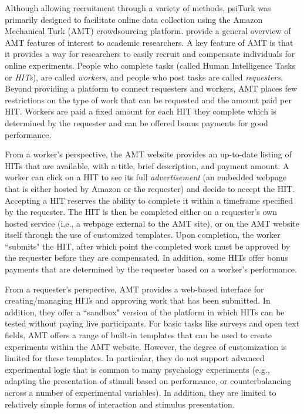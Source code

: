 \documentclass[twocolumn]{svjour3}          %
\begin{document}
Although allowing recruitment through a variety of methods,
\textsf{psiTurk} was primarily designed to facilitate online data collection using
the Amazon Mechanical Turk (AMT) crowdsourcing platform.
\cite{Mason:2012xy} provide a general overview of AMT features of
interest to academic researchers.  A key feature of AMT is that it provides a way for researchers
to easily recruit and compensate individuals for online experiments.  
People who complete tasks (called Human Intelligence Tasks or \emph{HITs}), are 
called \emph{workers}, and people who post tasks are called \emph{requesters}.
Beyond providing a platform to connect requesters and workers, AMT places few restrictions 
on the type of work that can be requested and the amount paid per HIT.  Workers are 
paid a fixed amount for each HIT they complete which is determined by the requester and
can be offered bonus payments for good performance.

From a worker's perspective, the AMT website provides an up-to-date listing of HITs that 
are available, with a title, brief description, and payment amount.  A worker can click on a HIT to 
see its full \emph{advertisement} (an embedded webpage that is either hosted by
Amazon or the requester) and decide to accept the HIT. 
Accepting a HIT reserves the ability to complete it within a timeframe specified by the requester.
The HIT is then be completed either on a requester's own hosted service (i.e., a webpage 
external to the AMT site), or on the AMT website itself through the use of customized templates.
Upon completion, the worker ``submits" the HIT, after which point the completed work must 
be approved by the requester before they are compensated.
In addition, some HITs offer bonus payments that are determined by the requester based 
on a worker's performance.

From a requester's perspective, AMT provides a web-based interface for creating/managing 
HITs and approving work that has been submitted.  In addition, they offer a ``sandbox" version 
of the platform in which HITs can be tested without paying live participants.
For basic tasks like surveys and open text fields, AMT offers a range of built-in templates that 
can be used to create experiments within the AMT website.  However, the degree of customization 
is limited for these templates. In particular, they do not support advanced experimental logic that is 
common to many psychology experiments (e.g., adapting the presentation of stimuli based on 
performance, or counterbalancing across a number of experimental variables).
In addition, they are limited to relatively simple forms of interaction and stimulus presentation.
\end{document}
